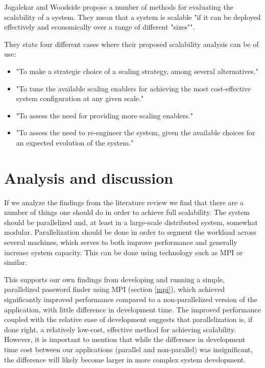 \documentclass{article}
\begin{document}
{Jogalekar and Woodside \cite{jogalekar2000evaluating} propose a number of
methods for evaluating the scalability of a system. They mean that a system is
scalable "if it can be deployed effectively and economically over a range of
different "sizes"". 

They state four different cases where their proposed scalability analysis can
be of use:
\begin{itemize}
\item{"To make a strategic choice of a scaling strategy, among several
alternatives."}
\item{"To tune the available scaling enablers for achieving the most
cost-effective system configuration at any given scale."}
\item{"To assess the need for providing more scaling enablers."}
\item{"To assess the need to re-engineer the system, given the available choices
for an expected evolution of the system."}
\end{itemize}


\section{Analysis and discussion}

If we analyze the findings from the literature review we find that there are a
number of things one should do in order to achieve full scalability.  The
system should be parallelized and, at least in a large-scale distributed
system, somewhat modular. Parallelization should be done in order to segment
the workload across several machines, which serves to both improve performance
and generally increase system
capacity\cite{fayad2005towards}\cite{haggander1999guidelines}\cite{caruso1997toward}.
This can be done using technology such as
MPI\cite{gropp1996high}\cite{miller2002pympi}\cite{millerparallel} or similar.

This supports our own findings from developing and running a simple,
parallelized password finder using MPI (section \ref{mpi}), which achieved
significantly improved performance compared to a non-parallelized version of
the application, with little difference in development time. The improved
performance coupled with the relative ease of development suggests that
parallelization is, if done right, a relatively low-cost, effective method for
achieving scalability. However, it is important to mention that while the
difference in development time cost between our applications (parallel and
non-parallel) was insignificant, the difference will likely become larger in
more complex system development.

}
\end{document}
